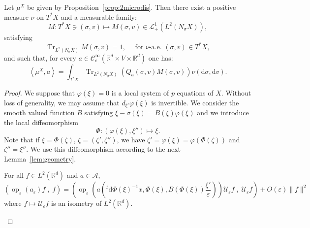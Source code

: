 \documentclass[AHL,Unicode,longabstracts]{cedram}
\DeclareMathOperator{\Trr}{Tr}
\DeclareMathOperator{\op}{op}
\newcommand*\R{{\mathbb R}}
\newcommand*\eps{\varepsilon}
\newcommand*\Tr{\Trr}
\numberwithin{equation}{section}
\newcommand*{\dd}{\mathrm{d}}
\newcommand*{\dv}{\dd v}
\newcommand*{\dsigma}{\dd \sigma}
\newcommand*{\dPhi}{\dd \Phi} %
\begin{document}
\begin{prop}\label{prop:compact}
Let $\mu^X$ be given by Proposition~\ref{prop:2microdis}. Then there exist a positive measure $\nu$ on $T^*X$ and a measurable family:
\[
M:T^*X\ni(\sigma,v)\longmapsto M(\sigma,v)\in \mathcal{L}^1_+(L^2(N_\sigma X)),
\]
satisfying
\[
\Tr_{L^2(N_\sigma X)} M(\sigma,v)=1,\quad \text{ for }\nu\text{-a.e. }(\sigma,v)\in T^*X,
\]
and such that, for every $a\in {\mathcal C}^\infty_c(\R^d\times V\times \R^d)$ one has:
\[
\left\langle \mu^{X},a\right\rangle = \int_{T^*X}\Tr_{L^2(N_\sigma X)}(Q_a(\sigma,v)M(\sigma,v))\nu(\dsigma,\dv).
\]
\end{prop}


\begin{proof}
We suppose that $\varphi(\xi)=0$ is a local system of $p$ equations of $X$. Without loss of generality, we may assume that $d_{\xi'} \varphi(\xi)$ is invertible. We consider the smooth valued function $B$ satisfying $\xi-\sigma(\xi)=B(\xi) \varphi(\xi)$ and we introduce the local diffeomorphism
\[
\Phi : \left(\varphi(\xi),\xi''\right)\mapsto \xi.
\]
Note that if $\xi=\Phi(\zeta)$, $\zeta=(\zeta',\zeta'')$, we have $\zeta'=\varphi(\xi)=\varphi(\Phi(\zeta))$ and $\zeta''=\xi''$. We use this diffeomorphism according to the next Lemma~\ref{lem:geometry}.

\begin{lemm}\label{lem:geometry}
For all $f\in L^2(\R^d)$ and $a\in{\mathcal A}$,
\[
\left(\op_\eps(a_\eps)f\;,\;f\right) = \left(\op_\eps\left(a\left(^t \dPhi (\xi)^{-1} x,\Phi(\xi),B\left(\Phi(\xi)\right) \frac{\xi'}{\eps}\right)\right) {\mathcal U}_\eps f\;,\;{\mathcal U}_\eps f\right) + O(\eps) \| f\| ^2
\]
where $f\mapsto {\mathcal U}_\eps f$ is an isometry of $L^2(\R^d)$.
\end{lemm}



\end{proof}
\end{document}
